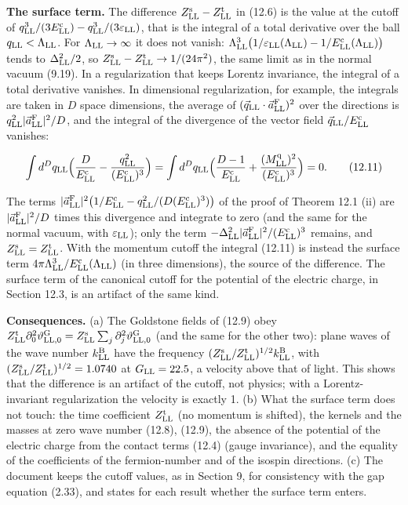 \documentclass[
  10pt,
]{article}
\begin{document}
\textbf{The surface term.} The difference
\(Z^{\rm s}_{\rm LL}-Z^{\rm t}_{\rm LL}\) in (12.6) is the value at the
cutoff of
\(q_{\rm LL}^3/(3E^{\rm c}_{\rm LL})-q_{\rm LL}^3/(3\varepsilon_{\rm LL})\),
that is the integral of a total derivative over the ball
\(q_{\rm LL}<\Lambda_{\rm LL}\). For \(\Lambda_{\rm LL}\to\infty\) it
does not vanish:
\(\Lambda_{\rm LL}^3\big(1/\varepsilon_{\rm LL}(\Lambda_{\rm LL})-1/E^{\rm c}_{\rm LL}(\Lambda_{\rm LL})\big)\)
tends to \(\Delta_{\rm LL}^2/2\), so
\(Z^{\rm s}_{\rm LL}-Z^{\rm t}_{\rm LL}\to1/(24\pi^2)\), the same limit
as in the normal vacuum (9.19). In a regularization that keeps Lorentz
invariance, the integral of a total derivative vanishes. In dimensional
regularization, for example, the integrals are taken in \(D\) space
dimensions, the average of
\((\vec q_{\rm LL}\cdot\vec a^{\rm F}_{\rm LL})^2\) over the directions
is \(q_{\rm LL}^2\lvert\vec a^{\rm F}_{\rm LL}\rvert^2/D\), and the
integral of the divergence of the vector field
\(\vec q_{\rm LL}/E^{\rm c}_{\rm LL}\) vanishes:

\[\int d^Dq_{\rm LL}\Big(\frac D{E^{\rm c}_{\rm LL}}-\frac{q_{\rm LL}^2}{(E^{\rm c}_{\rm LL})^3}\Big)=\int d^Dq_{\rm LL}\Big(\frac{D-1}{E^{\rm c}_{\rm LL}}+\frac{(M^{\rm q}_{\rm LL})^2}{(E^{\rm c}_{\rm LL})^3}\Big)=0.\tag{12.11}\]

The terms
\(\lvert\vec a^{\rm F}_{\rm LL}\rvert^2\big(1/E^{\rm c}_{\rm LL}-q_{\rm LL}^2/(D(E^{\rm c}_{\rm LL})^3)\big)\)
of the proof of Theorem 12.1 (ii) are
\(\lvert\vec a^{\rm F}_{\rm LL}\rvert^2/D\) times this divergence and
integrate to zero (and the same for the normal vacuum, with
\(\varepsilon_{\rm LL}\)); only the term
\(-\Delta_{\rm LL}^2\lvert\vec a^{\rm F}_{\rm LL}\rvert^2/(E^{\rm c}_{\rm LL})^3\)
remains, and \(Z^{\rm s}_{\rm LL}=Z^{\rm t}_{\rm LL}\). With the
momentum cutoff the integral (12.11) is instead the surface term
\(4\pi\Lambda_{\rm LL}^3/E^{\rm c}_{\rm LL}(\Lambda_{\rm LL})\) (in
three dimensions), the source of the difference. The surface term of the
canonical cutoff for the potential of the electric charge, in Section
12.3, is an artifact of the same kind.

\textbf{Consequences.} (a) The Goldstone fields of (12.9) obey
\(Z^{\rm t}_{\rm LL}\partial_0^2\vartheta^{\rm G}_{{\rm LL},0}=Z^{\rm s}_{\rm LL}\sum_j\partial_j^2\vartheta^{\rm G}_{{\rm LL},0}\)
(and the same for the other two): plane waves of the wave number
\(k^{\rm B}_{\rm LL}\) have the frequency
\((Z^{\rm s}_{\rm LL}/Z^{\rm t}_{\rm LL})^{1/2}k^{\rm B}_{\rm LL}\),
with \((Z^{\rm s}_{\rm LL}/Z^{\rm t}_{\rm LL})^{1/2}=1.0740\) at
\(G_{\rm LL}=22.5\), a velocity above that of light. This shows that the
difference is an artifact of the cutoff, not physics; with a
Lorentz-invariant regularization the velocity is exactly 1. (b) What the
surface term does not touch: the time coefficient \(Z^{\rm t}_{\rm LL}\)
(no momentum is shifted), the kernels and the masses at zero wave number
(12.8), (12.9), the absence of the potential of the electric charge from
the contact terms (12.4) (gauge invariance), and the equality of the
coefficients of the fermion-number and of the isospin directions. (c)
The document keeps the cutoff values, as in Section 9, for consistency
with the gap equation (2.33), and states for each result whether the
surface term enters.
\end{document}
